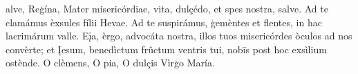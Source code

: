 alve, Reģína, Mater misericórdiae, vita, dulçédo, et spes nostra, salve. Ad te clamámus èxsules fílii Hevae. Ad te suspirámus, ģemèntes et flentes, in hac lacrimárum valle. Eįa, èrgo, advocáta nostra, illos tuos misericórdes òculos ad nos convèrte; et Įesum, benedìctum frûctum ventris tui, nobīs post hoc exsìlium ostènde. O clèmens, O pia, O dulçis Vìrģo María.
